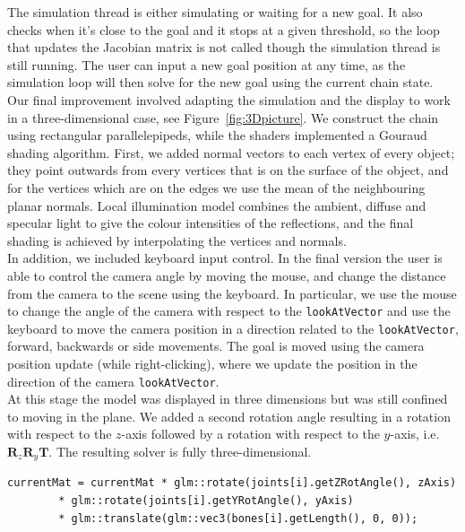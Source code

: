 \documentclass[paper=a4, fontsize=11pt]{scrartcl} %
\numberwithin{equation}{section} %
\numberwithin{figure}{section} %
\numberwithin{table}{section} %
\begin{document}
The simulation thread is either simulating or waiting for a new goal. It also checks when it's close to the goal and it stops at a given threshold, so the loop that updates the Jacobian matrix is not called though the simulation thread is still running. The user can input a new goal position at any time, as the simulation loop will then solve for the new goal using the current chain state.\\

Our final improvement involved adapting the simulation and the display to work in a three-dimensional case, see Figure~\ref{fig:3Dpicture}. We construct the chain using rectangular parallelepipeds, while the shaders implemented a Gouraud shading algorithm. First, we added normal vectors to each vertex of every object; they point outwards from every vertices that is on the surface of the object, and for the vertices which are on the edges we use the mean of the neighbouring planar normals. Local illumination model combines the ambient, diffuse and specular light to give the colour intensities of the reflections, and the final shading is achieved by interpolating the vertices and normals. \\

In addition, we included keyboard input control. In the final version the user is able to control the camera angle by moving the mouse, and change the distance from the camera to the scene using the keyboard. In particular, we use the mouse to change the angle of the camera with respect to the \texttt{lookAtVector} and use the keyboard to move the camera position in a direction related to the \texttt{lookAtVector}, forward, backwards or side movements. The goal is moved using the camera position update (while right-clicking), where we update the position in the direction of the camera \texttt{lookAtVector}.\\

At this stage the model was displayed in three dimensions but was still confined to moving in the plane. We added a second rotation angle resulting in a rotation with respect to the \(z\)-axis followed by a rotation with respect to the \(y\)-axis, i.e. \( \mathbf{R}_z \mathbf{R}_y \mathbf{T}\). The resulting solver is fully three-dimensional. \\


\begin{lstlisting}[float,caption=Update total transformation with current joint rotation and translation., label={lst:transformation}]
currentMat = currentMat * glm::rotate(joints[i].getZRotAngle(), zAxis)
		* glm::rotate(joints[i].getYRotAngle(), yAxis)
		* glm::translate(glm::vec3(bones[i].getLength(), 0, 0));
\end{lstlisting}
\end{document}
